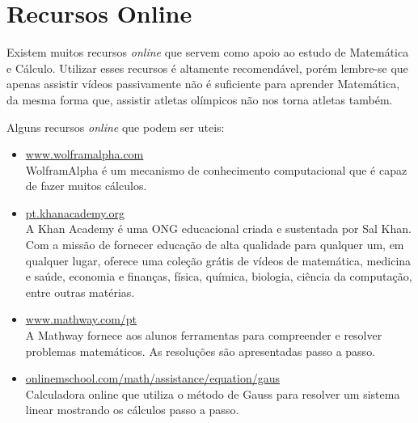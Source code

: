 \section*{Recursos Online}

Existem muitos recursos \textit{online} que servem como apoio ao estudo de Matemática e Cálculo.
Utilizar esses recursos é altamente recomendável, porém lembre-se que apenas assistir vídeos passivamente
não é suficiente para aprender Matemática, da mesma forma que, assistir atletas olímpicos não nos torna
atletas também.

Alguns recursos \textit{online} que podem ser uteis:
\begin{itemize}
    \item \href{http://www.wolframalpha.com}{www.wolframalpha.com} \\
         WolframAlpha é um mecanismo de conhecimento computacional que é capaz de fazer muitos cálculos.

    \item \href{http://pt.khanacademy.org}{pt.khanacademy.org} \\
        A Khan Academy é uma ONG educacional criada e sustentada por Sal Khan.
        Com a missão de fornecer educação de alta qualidade para qualquer um, em qualquer lugar,
        oferece uma coleção grátis de vídeos de matemática, medicina e saúde, economia e finanças,
        física, química, biologia, ciência da computação, entre outras matérias.

    \item \href{http://www.mathway.com/pt}{www.mathway.com/pt} \\
        A Mathway fornece aos alunos ferramentas para compreender e resolver problemas matemáticos.
        As resoluções são apresentadas passo a passo.

    \item \href{http://onlinemschool.com/math/assistance/equation/gaus}{onlinemschool.com/math/assistance/equation/gaus} \\
        Calculadora online que utiliza o método de Gauss para resolver um sistema linear mostrando os cálculos passo a passo.
\end{itemize}




